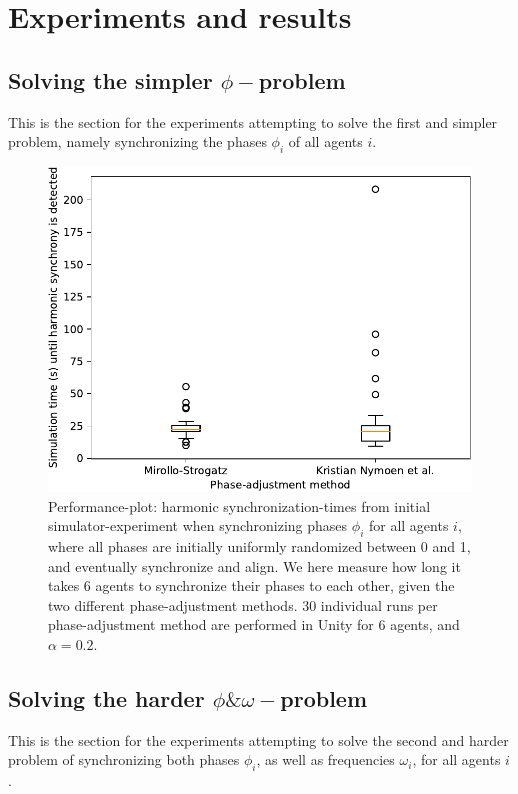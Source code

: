 \chapter{Experiments and results}
	
	\section{Solving the simpler $\phi-$problem}
	This is the section for the experiments attempting to solve the first and simpler problem, namely synchronizing the phases $\phi_i$ of all agents $i$. \nl
	
	\begin{figure}[ht!]
		\centering
		\includegraphics[width=0.7\linewidth]{Assets/Figures/Experiments/FirstExperimentPlot.pdf}
		\caption{Performance-plot: harmonic synchronization-times from initial simulator-experiment when synchronizing phases $\phi_i$ for all agents $i$, where all phases are initially uniformly randomized between 0 and 1, and eventually synchronize and align. We here measure how long it takes 6 agents to synchronize their phases to each other, given the two different phase-adjustment methods. 30 individual runs per phase-adjustment method are performed in Unity for 6 agents, and $\alpha=0.2$.}
		\label{fig:EPA1}
	\end{figure}
	
	
	\section{Solving the harder $\phi\&\omega-$problem}
	
	This is the section for the experiments attempting to solve the second and harder problem of synchronizing both phases $\phi_i$, as well as frequencies $\omega_i$, for all agents $i$.